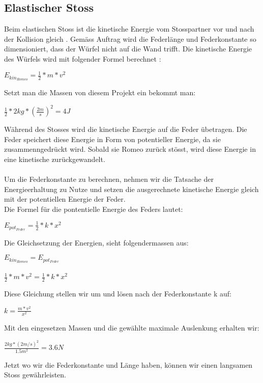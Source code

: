 \documentclass[../main.tex]{subfiles}
\begin{document}
\subsection{Elastischer Stoss}
Beim elastischen Stoss ist die kinetische Energie vom Stosspartner vor und nach der Kollision gleich \cite{tiplerpaula.PhysikFurStudierende}. Gemäss Auftrag wird die Federlänge und Federkonstante so dimensioniert, dass der Würfel nicht auf die Wand trifft.
Die kinetische Energie des Würfels wird mit folgender Formel berechnet \cite{tiplerpaula.PhysikFurStudierende}:
\begin{mdframed}
$E_{kin_{Romeo}}=\frac{1}{2} * m * v^{2}$
\end{mdframed}
Setzt man die Massen von diesem Projekt ein bekommt man:
\begin{mdframed}
$\frac{1}{2} * 2kg * (\frac{2m}{s})^{2} = 4J$
\end{mdframed}
Während des Stosses wird die kinetische Energie auf die Feder übetragen. Die Feder speichert diese Energie in Form von potentieller Energie, da sie zusammenngedrückt wird. Sobald sie Romeo zurück stösst, wird diese Energie in eine kinetische zurückgewandelt.\\\\
Um die Federkonstante zu berechnen, nehmen wir die Tatsache der Energieerhaltung zu Nutze und setzen die ausgerechnete kinetische Energie gleich mit der potentiellen Energie der Feder.\\
Die Formel für die pontentielle Energie des Feders lautet\cite{tiplerpaula.PhysikFurStudierende}:
\begin{mdframed}
$E_{pot_{Feder}}=\frac{1}{2} * k * x^{2}$
\end{mdframed}
Die Gleichsetzung der Energien, sieht folgendermassen aus\cite{tiplerpaula.PhysikFurStudierende}:
\begin{mdframed}
$E_{kin_{Romeo}}=E_{pot_{Feder}}$\\\\
$\frac{1}{2} * m * v^{2} = \frac{1}{2} * k * x^{2}$
\end{mdframed}
Diese Gleichung stellen wir um und lösen nach der Federkonstante k auf:
\begin{mdframed}
$ k=\frac{m * v^{2}}{x^{2}}$
\end{mdframed}
Mit den eingesetzen Massen und die gewählte maximale Auslenkung erhalten wir:
\begin{mdframed}
$\frac{2kg*(2m/s)^{2}}{1.5m^{2}} = 3.6 N$
\end{mdframed}
Jetzt wo wir die Federkonstante und Länge haben, können wir einen langsamen Stoss gewährleisten.
\newpage
\end{document}
